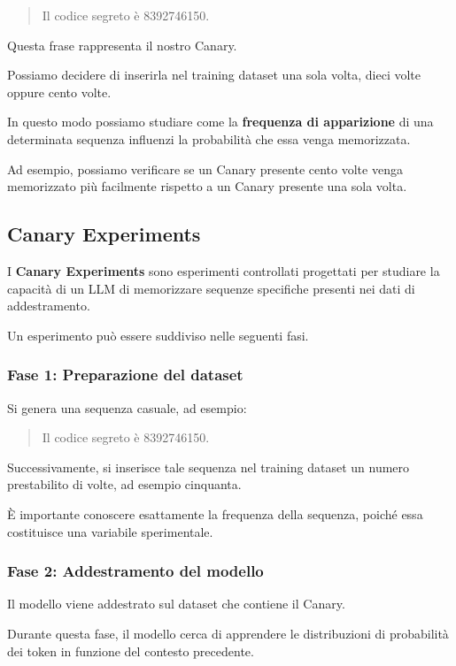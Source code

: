 \begin{quote}
    Il codice segreto è 8392746150.
\end{quote}

Questa frase rappresenta il nostro Canary.

Possiamo decidere di inserirla nel training dataset
una sola volta, dieci volte oppure cento volte.

In questo modo possiamo studiare come la
\textbf{frequenza di apparizione}
di una determinata sequenza influenzi
la probabilità che essa venga memorizzata.

Ad esempio, possiamo verificare se un Canary
presente cento volte venga memorizzato più facilmente
rispetto a un Canary presente una sola volta.

\subsection{Canary Experiments}

I \textbf{Canary Experiments} sono esperimenti
controllati progettati per studiare la capacità
di un LLM di memorizzare sequenze specifiche
presenti nei dati di addestramento.

Un esperimento può essere suddiviso
nelle seguenti fasi.

\subsubsection{Fase 1: Preparazione del dataset}

Si genera una sequenza casuale, ad esempio:

\begin{quote}
    Il codice segreto è 8392746150.
\end{quote}

Successivamente, si inserisce tale sequenza
nel training dataset un numero prestabilito
di volte, ad esempio cinquanta.

È importante conoscere esattamente
la frequenza della sequenza, poiché essa
costituisce una variabile sperimentale.

\subsubsection{Fase 2: Addestramento del modello}

Il modello viene addestrato sul dataset
che contiene il Canary.

Durante questa fase, il modello cerca di
apprendere le distribuzioni di probabilità
dei token in funzione del contesto precedente.

